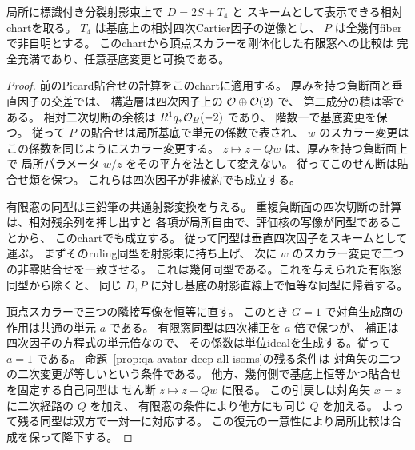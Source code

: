 \begin{corollary}[重複負断面chartの相対全Isom比較]
\label{cor:qa-avatar-deep-scalar-full-isom}
局所に標識付き分裂射影束上で $D=2S+T_4$ と
スキームとして表示できる相対chartを取る。
$T_4$ は基底上の相対四次Cartier因子の逆像とし、
$P$ は全幾何fiberで非自明とする。
このchartから頂点スカラーを剛体化した有限窓への比較は
完全充満であり、任意基底変更と可換である。
\end{corollary}
\begin{proof}
前のPicard貼合せの計算をこのchartに適用する。
厚みを持つ負断面と垂直因子の交差では、
構造層は四次因子上の $\mathcal O\oplus\mathcal O(2)$ で、
第二成分の積は零である。
相対二次切断の余核は $R^1q_*\mathcal O_B(-2)$ であり、
階数一で基底変更を保つ。
従って $P$ の貼合せは局所基底で単元の係数で表され、
$w$ のスカラー変更はこの係数を同じようにスカラー変更する。
$z\mapsto z+Qw$ は、厚みを持つ負断面上で
局所パラメータ $w/z$ をその平方を法として変えない。
従ってこのせん断は貼合せ類を保つ。
これらは四次因子が非被約でも成立する。

有限窓の同型は三鉛筆の共通射影変換を与える。
重複負断面の四次切断の計算は、相対残余列を押し出すと
各項が局所自由で、評価核の写像が同型であることから、
このchartでも成立する。
従って同型は垂直四次因子をスキームとして運ぶ。
まずそのruling同型を射影束に持ち上げ、
次に $w$ のスカラー変更で二つの非零貼合せを一致させる。
これは幾何同型である。これを与えられた有限窓同型から除くと、
同じ $D,P$ に対し基底の射影直線上で恒等な同型に帰着する。

頂点スカラーで三つの隣接写像を恒等に直す。
このとき $G=1$ で対角生成商の作用は共通の単元 $a$ である。
有限窓同型は四次補正を $a$ 倍で保つが、
補正は四次因子の方程式の単元倍なので、
その係数は単位idealを生成する。従って $a=1$ である。
命題~\ref{prop:qa-avatar-deep-all-isoms}の残る条件は
対角矢の二つの二次変更が等しいという条件である。
他方、幾何側で基底上恒等かつ貼合せを固定する自己同型は
せん断 $z\mapsto z+Qw$ に限る。
この引戻しは対角矢 $x=z$ に二次経路の $Q$ を加え、
有限窓の条件により他方にも同じ $Q$ を加える。
よって残る同型は双方で一対一に対応する。
この復元の一意性により局所比較は合成を保って降下する。
\end{proof}

